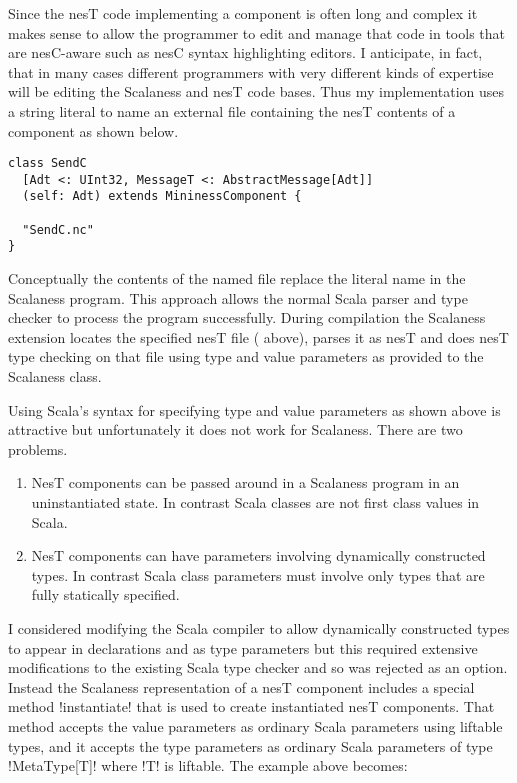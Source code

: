 Since the nesT code implementing a component is often long and complex it makes sense to allow
the programmer to edit and manage that code in tools that are nesC-aware such as nesC syntax
highlighting editors. I anticipate, in fact, that in many cases different programmers with very
different kinds of expertise will be editing the Scalaness and nesT code bases. Thus my
implementation uses a string literal to name an external file containing the nesT contents of a
component as shown below.

\singlespace
\begin{lstlisting}[language=scalaness]
class SendC
  [Adt <: UInt32, MessageT <: AbstractMessage[Adt]]
  (self: Adt) extends MininessComponent {

  "SendC.nc"
}
\end{lstlisting}
\primaryspacing

Conceptually the contents of the named file replace the literal name in the Scalaness program.
This approach allows the normal Scala parser and type checker to process the program
successfully. During compilation the Scalaness extension locates the specified nesT file
( above), parses it as nesT and does nesT type checking on that file using
type and value parameters as provided to the Scalaness class.

Using Scala's syntax for specifying type and value parameters as shown above is attractive but
unfortunately it does not work for Scalaness. There are two problems.
\begin{enumerate}
\item NesT components can be passed around in a Scalaness program in an uninstantiated state. In
  contrast Scala classes are not first class values in Scala.
\item NesT components can have parameters involving dynamically constructed types. In contrast
  Scala class parameters must involve only types that are fully statically specified.
\end{enumerate}

I considered modifying the Scala compiler to allow dynamically constructed types to appear in
declarations and as type parameters but this required extensive modifications to the existing
Scala type checker and so was rejected as an option. Instead the Scalaness representation of a
nesT component includes a special method !instantiate! that is used to create instantiated nesT
components. That method accepts the value parameters as ordinary Scala parameters using liftable
types, and it accepts the type parameters as ordinary Scala parameters of type !MetaType[T]!
where !T! is liftable. The example above becomes:

